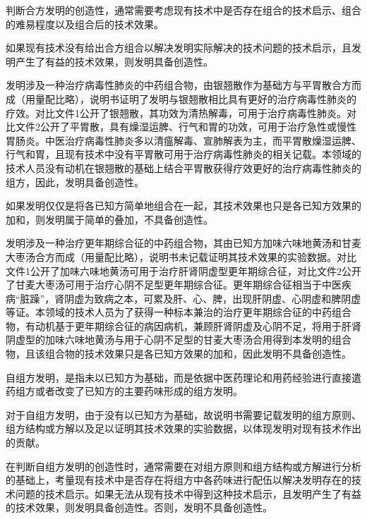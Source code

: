判断合方发明的创造性，通常需要考虑现有技术中是否存在组合的技术启示、组合的难易程度以及组合后的技术效果。

如果现有技术没有给出合方组合以解决发明实际解决的技术问题的技术启示，且发明产生了有益的技术效果，则发明具备创造性。

{\par}

发明涉及一种治疗病毒性肺炎的中药组合物，由银翘散作为基础方与平胃散合方而成（用量配比略），说明书证明了发明与银翘散相比具有更好的治疗病毒性肺炎的疗效。对比文件1公开了银翘散，其功效为清热解毒，可用于治疗病毒性肺炎。对比文件2公开了平胃散，具有燥湿运脾、行气和胃的功效，可用于治疗急性或慢性胃肠炎。中医治疗病毒性肺炎多以清瘟解毒、宣肺解表为主，而平胃散燥湿运脾、行气和胃，且现有技术中没有平胃散可用于治疗病毒性肺炎的相关记载。本领域的技术人员没有动机在银翘散的基础上结合平胃散获得疗效更好的治疗病毒性肺炎的组方，因此，发明具备创造性。

如果发明仅仅是将各已知方简单地组合在一起，其技术效果也只是各已知方效果的加和，则发明属于简单的叠加，不具备创造性。

{\par}

{\setlength{\parindent}{22.7bp}发明涉及一种治疗更年期综合征的中药组合物，其由已知方加味六味地黄汤和甘麦大枣汤合方而成（用量配比略），说明书未记载证明其技术效果的实验数据。对比文件1公开了加味六味地黄汤可用于治疗肝肾阴虚型更年期综合征，对比文件2公开了甘麦大枣汤可用于治疗心阴不足型更年期综合征。更年期综合征相当于中医疾病“脏躁”，肾阴虚为致病之本，可累及肝、心、脾，出现肝阴虚、心阴虚和脾阴虚等证。本领域的技术人员为了获得一种标本兼治的治疗更年期综合征的中药组合物，有动机基于更年期综合征的病因病机，兼顾肝肾阴虚及心阴不足，将用于肝肾阴虚型的加味六味地黄汤与用于心阴不足型的甘麦大枣汤合用得到本发明的组合物，且该组合物的技术效果只是各已知方效果的加和，因此发明不具备创造性。\par}

自组方发明，是指未以已知方为基础，而是依据中医药理论和用药经验进行直接遣药组方或者改变了已知方的主要药味形成的组方发明。

对于自组方发明，由于没有以已知方为基础，故说明书需要记载发明的组方原则、组方结构或方解以及足以证明其技术效果的实验数据，以体现发明对现有技术作出的贡献。

在判断自组方发明的创造性时，通常需要在对组方原则和组方结构或方解进行分析的基础上，考量现有技术中是否存在将组方中各药味进行配伍以解决发明存在的技术问题的技术启示。如果无法从现有技术中得到这种技术启示，且发明产生了有益的技术效果，则发明具备创造性。否则，发明不具备创造性。

